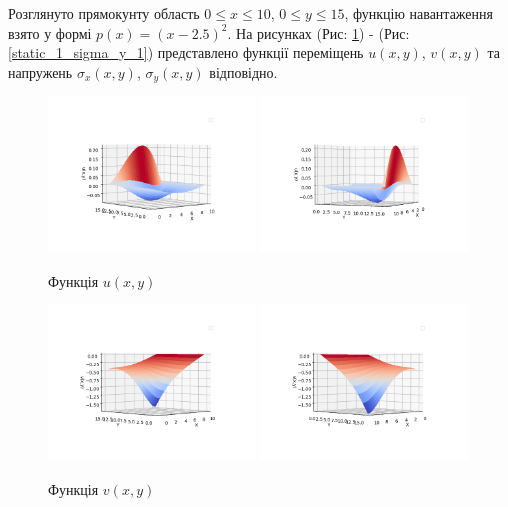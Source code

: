 Розглянуто прямокунту область $0 \le x \le 10$, $0 \le y \le 15$, функцію навантаження взято у формі $p(x)=(x-2.5)^2$.
На рисунках (Рис: \ref{static_1_u_1}) - (Рис: \ref{static_1_sigma_y_1})
представлено функції переміщень $u(x,y)$, $v(x,y)$ та напружень $\sigma_x(x,y)$, $\sigma_y(x,y)$ відповідно.
\begin{figure}[h!]
    \begin{center}
        \includegraphics[width=0.49\textwidth, scale=1]{images/results/static_1/function_u_1.png}
        \includegraphics[width=0.49\textwidth, scale=1]{images/results/static_1/function_u_2.png}
        \caption{Функція $u(x, y)$}\label{static_1_u_1}
    \end{center}
\end{figure}
\newpage
\begin{figure}[h!]
    \begin{center}
        \includegraphics[width=0.49\textwidth, scale=1]{images/results/static_1/function_v_1.png}
        \includegraphics[width=0.49\textwidth, scale=1]{images/results/static_1/function_v_2.png}
        \caption{Функція $v(x, y)$}\label{static_1_v_1}
    \end{center}
\end{figure}
